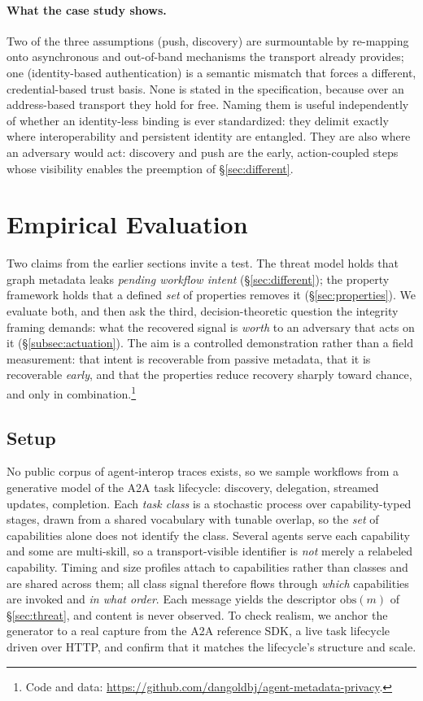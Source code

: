 \documentclass[10pt,twocolumn]{article}
\theoremstyle{definition}
\begin{document}
\paragraph{What the case study shows.} Two of the three assumptions (push,
discovery) are surmountable by re-mapping onto asynchronous and out-of-band
mechanisms the transport already provides; one (identity-based authentication) is a
semantic mismatch that forces a different, credential-based trust basis. None is
stated in the specification, because over an address-based transport they hold for
free. Naming them is useful independently of whether an identity-less binding is
ever standardized: they delimit exactly where interoperability and persistent
identity are entangled. They are also where an adversary would act: discovery and
push are the early, action-coupled steps whose visibility enables the preemption of
\S\ref{sec:different}.

\section{Empirical Evaluation}\label{sec:eval}
Two claims from the earlier sections invite a test. The threat model holds that graph
metadata leaks \emph{pending workflow intent} (\S\ref{sec:different}); the property
framework holds that a defined \emph{set} of properties removes it
(\S\ref{sec:properties}). We evaluate both, and then ask the third, decision-theoretic
question the integrity framing demands: what the recovered signal is \emph{worth} to
an adversary that acts on it (\S\ref{subsec:actuation}). The aim is a controlled demonstration
rather than a field measurement: that intent is recoverable from passive metadata,
that it is recoverable \emph{early}, and that the properties reduce recovery sharply
toward chance, and only in combination.\footnote{Code and data:
\url{https://github.com/dangoldbj/agent-metadata-privacy}.}

\subsection{Setup}
No public corpus of agent-interop traces exists, so we sample workflows from a
generative model of the A2A task lifecycle: discovery, delegation, streamed updates,
completion. Each \emph{task class} is a stochastic process over capability-typed
stages, drawn from a shared vocabulary with tunable overlap, so the \emph{set} of
capabilities alone does not identify the class. Several agents serve each capability
and some are multi-skill, so a transport-visible identifier is \emph{not} merely a
relabeled capability. Timing and size profiles attach to capabilities rather than
classes and are shared across them; all class signal therefore flows through
\emph{which} capabilities are invoked and \emph{in what order}. Each message yields
the descriptor $\mathrm{obs}(m)$ of \S\ref{sec:threat}, and content is never observed.
To check realism, we anchor the generator to a real capture from the A2A reference
SDK, a live task lifecycle driven over HTTP, and confirm that it matches the
lifecycle's structure and scale.
\end{document}
